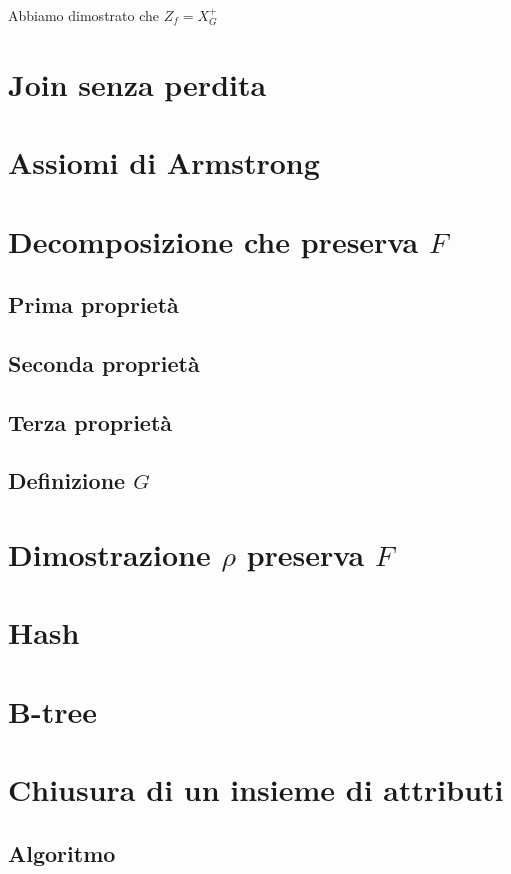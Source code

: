 \documentclass{article}
\begin{document}
Abbiamo dimostrato che \textbf{$Z_f = X_G^+$}
\pagebreak


\section{Join senza perdita}













\pagebreak
\section{Assiomi di Armstrong}
\pagebreak
\section{Decomposizione che preserva $F$}
\subsection{Prima proprietà}
\subsection{Seconda proprietà}
\subsection{Terza proprietà}
\subsection{Definizione $G$}
\pagebreak
\section{Dimostrazione $\rho$ preserva $F$}
\pagebreak
\section{Hash}
\pagebreak
\section{B-tree}
\pagebreak
\section{Chiusura di un insieme di attributi}
\subsection{Algoritmo}
\end{document}
